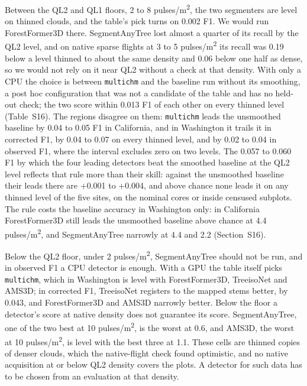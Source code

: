 \documentclass[journal]{IEEEtran}
\begin{document}
Between the QL2 and QL1 floors, 2 to 8 pulses/m\textsuperscript{2}, the two segmenters are level
on thinned clouds, and the table's pick turns on 0.002 F1. We would run
ForestFormer3D there. SegmentAnyTree lost almost a quarter of its recall by the
QL2 level, and on native sparse flights at 3 to 5 pulses/m\textsuperscript{2} its recall was 0.19
below a level thinned to about the same density and 0.06 below one half as
dense, so we would not rely on it near QL2 without a check at that density. With
only a CPU the choice is between \texttt{multichm} and the baseline run without its
smoothing, a post hoc configuration that was not a candidate of the table and
has no held-out check; the two score within 0.013 F1 of each other on every
thinned level (Table~S16). The regions disagree on them: \texttt{multichm} leads the
unsmoothed baseline by 0.04 to 0.05 F1 in California, and in Washington it
trails it in corrected F1, by 0.04 to 0.07 on every thinned level, and by 0.02
to 0.04 in observed F1, where the interval excludes zero on two levels. The
0.057 to 0.060 F1 by which the four leading detectors beat the smoothed baseline
at the QL2 level reflects that rule more than their skill: against the
unsmoothed baseline their leads there are +0.001 to +0.004, and above chance
none leads it on any thinned level of the five sites, on the nominal cores or
inside censused subplots. The rule costs the baseline accuracy in Washington
only: in California ForestFormer3D still leads the unsmoothed baseline above
chance at 4.4 pulses/m\textsuperscript{2}, and SegmentAnyTree narrowly at 4.4 and 2.2 (Section~S16).

Below the QL2 floor, under 2 pulses/m\textsuperscript{2}, SegmentAnyTree should not be run, and in
observed F1 a CPU detector is enough. With a GPU the table itself picks
\texttt{multichm}, which in Washington is level with ForestFormer3D, TreeisoNet and
AMS3D; in corrected F1, TreeisoNet registers to the mapped stems better, by
0.043, and ForestFormer3D and AMS3D narrowly better. Below the floor a
detector's score at native density does not guarantee its score. SegmentAnyTree,
one of the two best at 10 pulses/m\textsuperscript{2}, is the worst at 0.6, and AMS3D, the worst
at 10 pulses/m\textsuperscript{2}, is level with the best three at 1.1. These cells are thinned
copies of denser clouds, which the native-flight check found optimistic, and no
native acquisition at or below QL2 density covers the plots. A detector for such
data has to be chosen from an evaluation at that density.
\end{document}
